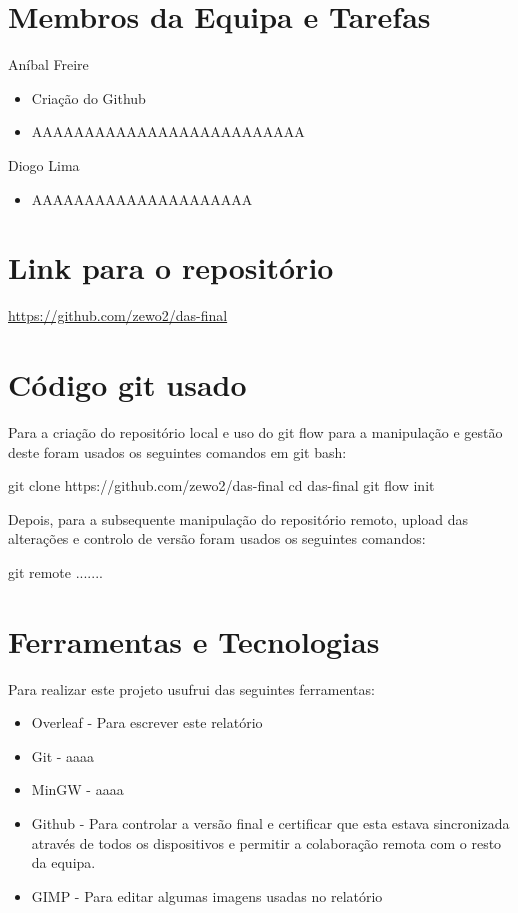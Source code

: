 \documentclass[a4paper,12pt]{article}
\begin{document}
\section{Membros da Equipa e Tarefas}

Aníbal Freire
\begin{itemize}
    \item Criação do Github
    \item AAAAAAAAAAAAAAAAAAAAAAAAAA
\end{itemize}
\vspace{0.2cm}

\noindent
Diogo Lima
\begin{itemize}
    \item AAAAAAAAAAAAAAAAAAAAA
\end{itemize}
\vspace{0.2cm}

\newpage
\section{Link para o repositório}

\url{https://github.com/zewo2/das-final}

\section{Código git usado}

Para a criação do repositório local e uso do git flow para a manipulação e gestão deste foram usados os seguintes comandos em git bash:

git clone https://github.com/zewo2/das-final
cd das-final
git flow init


Depois, para a subsequente manipulação do repositório remoto, upload das alterações e controlo de versão foram usados os seguintes comandos:

git remote .......

\section{Ferramentas e Tecnologias}
Para realizar este projeto usufrui das seguintes ferramentas:
\begin{itemize}
    \item Overleaf - Para escrever este relatório
    \item Git - aaaa
    \item MinGW - aaaa
    \item Github - Para  controlar a versão final e certificar que esta estava sincronizada através de todos os dispositivos e permitir a colaboração remota com o resto da equipa.
    \item GIMP - Para editar algumas imagens usadas no relatório
\end{itemize}
\end{document}
